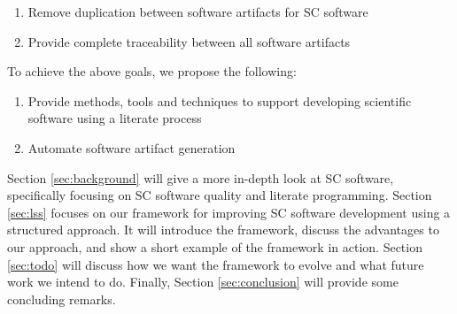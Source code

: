 \documentclass{sig-alternate-05-2015}
\begin{document}
\begin{enumerate}
\item Remove duplication between software artifacts for SC
  software \cite{WilsonEtAl2013}
\item Provide complete traceability between all software artifacts
\end{enumerate}

To achieve the above goals, we propose the following:

\begin{enumerate}
\item Provide methods, tools and techniques to support developing scientific
  software using a literate process
\item Automate software artifact generation
\end{enumerate}

Section \ref{sec:background} will give a more in-depth look at SC software,
specifically focusing on SC software quality and literate programming. Section
\ref{sec:lss} focuses on our framework %
for improving SC software development using a structured approach. It will
introduce the framework, discuss the advantages to our approach, and show
a short example of the framework in action. Section \ref{sec:todo} will discuss
how we want the framework to evolve and what future work we intend to do.
Finally, Section \ref{sec:conclusion} will provide some concluding remarks.

%
%
%
%
%
%
\end{document}
